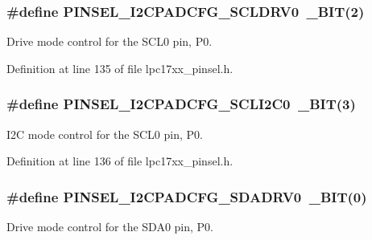 \subsubsection[{\texorpdfstring{P\+I\+N\+S\+E\+L\+\_\+\+I2\+C\+P\+A\+D\+C\+F\+G\+\_\+\+S\+C\+L\+D\+R\+V0}{PINSEL_I2CPADCFG_SCLDRV0}}]{\setlength{\rightskip}{0pt plus 5cm}\#define P\+I\+N\+S\+E\+L\+\_\+\+I2\+C\+P\+A\+D\+C\+F\+G\+\_\+\+S\+C\+L\+D\+R\+V0~{\bf \+\_\+\+B\+IT}(2)}\hypertarget{group___p_i_n_s_e_l___private___macros_ga7ee73f8fec052b869ea634112485d40b}{}\label{group___p_i_n_s_e_l___private___macros_ga7ee73f8fec052b869ea634112485d40b}
Drive mode control for the S\+C\+L0 pin, P0. 

Definition at line 135 of file lpc17xx\+\_\+pinsel.\+h.

\subsubsection[{\texorpdfstring{P\+I\+N\+S\+E\+L\+\_\+\+I2\+C\+P\+A\+D\+C\+F\+G\+\_\+\+S\+C\+L\+I2\+C0}{PINSEL_I2CPADCFG_SCLI2C0}}]{\setlength{\rightskip}{0pt plus 5cm}\#define P\+I\+N\+S\+E\+L\+\_\+\+I2\+C\+P\+A\+D\+C\+F\+G\+\_\+\+S\+C\+L\+I2\+C0~{\bf \+\_\+\+B\+IT}(3)}\hypertarget{group___p_i_n_s_e_l___private___macros_ga2e19e5c328764503a265fbd2c4cbb718}{}\label{group___p_i_n_s_e_l___private___macros_ga2e19e5c328764503a265fbd2c4cbb718}
I2C mode control for the S\+C\+L0 pin, P0. 

Definition at line 136 of file lpc17xx\+\_\+pinsel.\+h.

\subsubsection[{\texorpdfstring{P\+I\+N\+S\+E\+L\+\_\+\+I2\+C\+P\+A\+D\+C\+F\+G\+\_\+\+S\+D\+A\+D\+R\+V0}{PINSEL_I2CPADCFG_SDADRV0}}]{\setlength{\rightskip}{0pt plus 5cm}\#define P\+I\+N\+S\+E\+L\+\_\+\+I2\+C\+P\+A\+D\+C\+F\+G\+\_\+\+S\+D\+A\+D\+R\+V0~{\bf \+\_\+\+B\+IT}(0)}\hypertarget{group___p_i_n_s_e_l___private___macros_ga8a299707e5701134a2cb2986c3e89143}{}\label{group___p_i_n_s_e_l___private___macros_ga8a299707e5701134a2cb2986c3e89143}
Drive mode control for the S\+D\+A0 pin, P0. 

